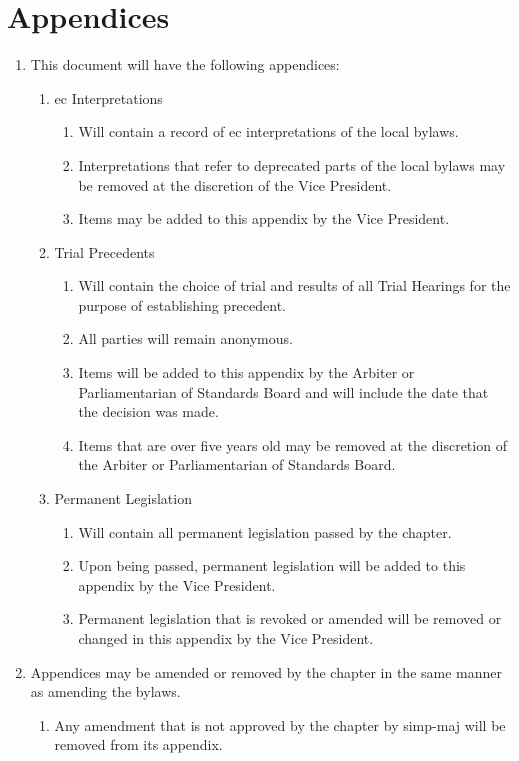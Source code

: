 \section{Appendices}
	\label{appendices}
	\begin{enumerate}
		\item This document will have the following appendices:
			\begin{enumerate}
				\item \gls{ec} Interpretations
					\begin{enumerate}
						\item Will contain a record of \gls{ec} interpretations of the local bylaws.
						\item Interpretations that refer to deprecated parts of the local bylaws may be removed at the discretion of the Vice President.
						\item Items may be added to this appendix by the Vice President.
					\end{enumerate}
				\item Trial Precedents
					\begin{enumerate}
						\item Will contain the choice of trial and results of all Trial Hearings for the purpose of establishing precedent.
						\item All parties will remain anonymous.
						\item Items will be added to this appendix by the Arbiter or Parliamentarian of Standards Board and will include the date that the decision was made.
						\item Items that are over five years old may be removed at the discretion of the Arbiter or Parliamentarian of Standards Board.
					\end{enumerate}
				\item Permanent Legislation
					\begin{enumerate}
						\item Will contain all permanent legislation passed by the chapter.
						\item Upon being passed, permanent legislation will be added to this appendix by the Vice President.
						\item Permanent legislation that is revoked or amended will be removed or changed in this appendix by the Vice President.
					\end{enumerate}
			\end{enumerate}
		\item Appendices may be amended or removed by the chapter in the same manner as amending the bylaws.
			\begin{enumerate}
				\item Any amendment that is not approved by the chapter by \gls{simp-maj} will be removed from its appendix.
			\end{enumerate}
	\end{enumerate}


